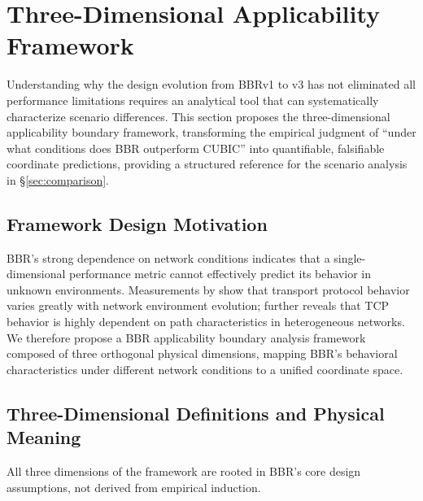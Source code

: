 \documentclass[a4paper,fleqn]{cas-sc}
\begin{document}
\FloatBarrier

\section{Three-Dimensional Applicability Framework}
\label{sec:framework}

Understanding why the design evolution from BBRv1 to v3 has not eliminated all
performance limitations requires an analytical tool that can systematically
characterize scenario differences. This section proposes the three-dimensional
applicability boundary framework, transforming the empirical judgment of ``under
what conditions does BBR outperform CUBIC'' into quantifiable, falsifiable
coordinate predictions, providing a structured reference for the scenario
analysis in \S\ref{sec:comparison}.

\subsection{Framework Design Motivation}

BBR's strong dependence on network conditions indicates that a single-dimensional
performance metric cannot effectively predict its behavior in unknown environments.
Measurements by \citet{medina2004transport} show that transport protocol behavior
varies greatly with network environment evolution; \citet{barakat2000tcp} further
reveals that TCP behavior is highly dependent on path characteristics in
heterogeneous networks. We therefore propose a BBR applicability boundary
analysis framework composed of three orthogonal physical dimensions, mapping BBR's
behavioral characteristics under different network conditions to a unified
coordinate space.

\subsection{Three-Dimensional Definitions and Physical Meaning}
\label{sec:framework_dim}

All three dimensions of the framework are rooted in BBR's core design
assumptions, not derived from empirical induction.
\end{document}

